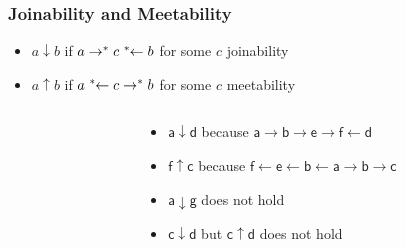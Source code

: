 \documentclass[12pt,aspectratio=169]{beamer}
\newcommand{\m}[1]{\mathsf{#1}}
\begin{document}
\begin{frame}
    \frametitle{Joinability and Meetability}
    \begin{definition}
        \begin{itemize}
            \item \alert{$a \downarrow b$} if $a \rightarrow^* c \;\reflectbox{$\rightarrow^*$}\; b$ for some $c$ \hfill \alert{joinability}
            \item \alert{$a \uparrow b$} if $a \;\reflectbox{$\rightarrow^*$}\; c \rightarrow^* b$ for some $c$ \hfill \alert{meetability}
        \end{itemize}
    \end{definition}

    \begin{example}
    \begin{columns}
        \begin{column}{0.35\textwidth}
            \centering
            \fig
        \end{column}
        \begin{column}{0.5\textwidth}
            \begin{itemize}
                \item $\m{a} \downarrow \m{d}$ because $\m{a} \rightarrow \m{b} \rightarrow \m{e} \rightarrow \m{f} \leftarrow \m{d}$
                \item $\m{f} \uparrow \m{c}$ because $\m{f} \leftarrow \m{e} \leftarrow \m{b} \leftarrow \m{a} \rightarrow \m{b} \rightarrow \m{c}$
                \item $\m{a} \downarrow \m{g}$ does not hold
                \item $\m{c} \downarrow \m{d}$ but $\m{c} \uparrow \m{d}$ does not hold
            \end{itemize}
        \end{column}
        \end{columns}
    \end{example}
\end{frame}
\end{document}
